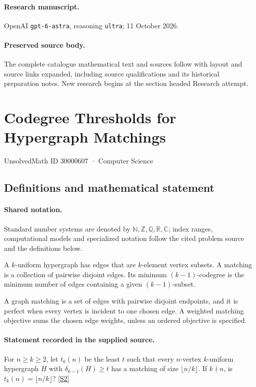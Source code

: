 \documentclass[11pt]{article}
\begin{document}
\paragraph{Research manuscript.} OpenAI \texttt{gpt-6-astra}, reasoning \texttt{ultra}; 11 October 2026.
\paragraph{Preserved source body.} The complete catalogue mathematical text and sources follow with layout and source links expanded, including source qualifications and its historical preparation notes. New research begins at the section headed Research attempt.

\section{Codegree Thresholds for Hypergraph Matchings}\label{30000607}
{\small UnsolvedMath ID 30000607 · Computer Science}
\subsection{Definitions and mathematical statement}

\paragraph{Shared notation.}Standard number systems are denoted by $\mathbb N,\mathbb Z,\mathbb Q,\mathbb R,\mathbb C$; index ranges, computational models and specialized notation follow the cited problem source and the definitions below.


A $k$-uniform hypergraph has edges that are $k$-element vertex subsets. A matching is a collection of pairwise disjoint edges. Its minimum $(k-1)$-codegree is the minimum number of edges containing a given $(k-1)$-subset.

A graph matching is a set of edges with pairwise disjoint endpoints, and it is perfect when every vertex is incident to one chosen edge. A weighted matching objective sums the chosen edge weights, unless an ordered objective is specified.
\paragraph{Statement recorded in the supplied source.}
For $n\geq k\geq2$, let $t_k(n)$ be the least $t$ such that every $n$-vertex $k$-uniform hypergraph $H$ with $\delta_{k-1}(H)\geq t$ has a matching of size $\lfloor n/k\rfloor$. If $k\nmid n$, is $t_k(n)=\lfloor n/k\rfloor$? \href{https://doi.org/10.4171/owr/2006/48}{[S2]}
\end{document}
